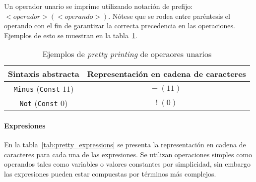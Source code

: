Un operador unario se imprime utilizando notación de prefijo: $<operador> (<operando>)$.
Nótese que se rodea entre paréntesis el operando con el fin de garantizar la correcta precedencia en las operaciones.
Ejemplos de esto se muestran en la tabla~\ref{tab:pretty_un_op}.

\begin{table}[h!]
\centering
\begin{tabular}{|c|c|}
  \hline
  \textbf{Sintaxis abstracta} & \textbf{Representación en cadena de caracteres} \\ [0.5ex]
  \hline \hline
  \verb|Minus| (\verb|Const| $11$) & $-\ (11)$ \\
  \verb|Not| (\verb|Const| $0$) & $!\ (0)$ \\
  \hline
\end{tabular}

\caption{Ejemplos de \textit{pretty printing} de operaores unarios}
\label{tab:pretty_un_op}
\end{table}


\paragraph*{Expresiones}
En la tabla~\ref{tab:pretty_expressions} se presenta la representación en cadena de caracteres para cada una de las expresiones.
Se utilizan operaciones simples como operandos tales como variables o valores constantes por simplicidad, sin embargo las expresiones pueden estar compuestas por términos más complejos.

